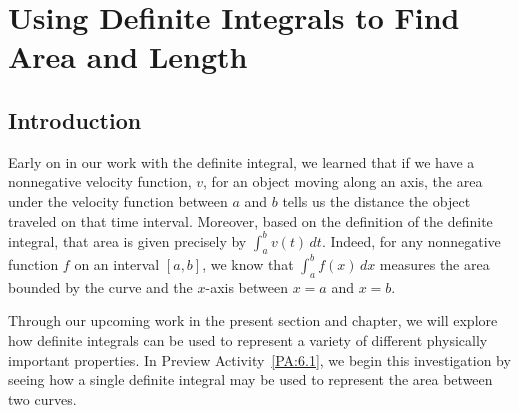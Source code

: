 \section{Using Definite Integrals to Find Area and Length} \label{S:6.1.Area}

\vspace*{-14 pt}

\subsection*{Introduction}


Early on in our work with the definite integral, we learned that if we have a nonnegative velocity function, $v$, for an object moving along an axis, the area under the velocity function between $a$ and $b$ tells us the distance the object traveled on that time interval.  Moreover, based on the definition of the definite integral, that area is given precisely by $\int_a^b v(t) \, dt$.  Indeed, for any nonnegative function $f$ on an interval $[a,b]$, we know that $\int_a^b f(x) \, dx$ measures the area bounded by the curve and the $x$-axis between $x = a$ and $x = b$.%

Through our upcoming work in the present section and chapter, we will explore how definite integrals can be used to represent a variety of different physically important properties.  In Preview Activity~\ref{PA:6.1}, we begin this investigation by seeing how a single definite integral may be used to represent the area between two curves.

